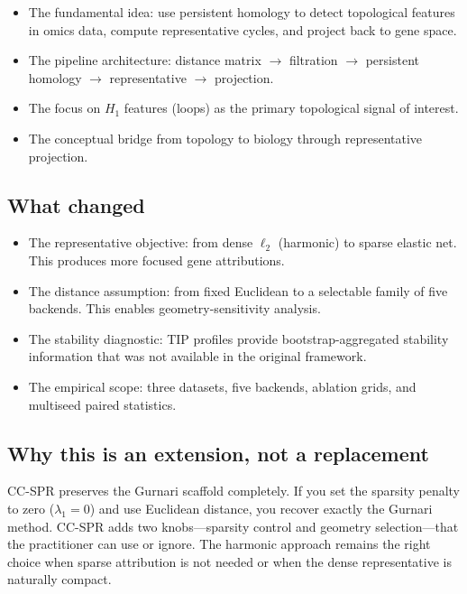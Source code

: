 \documentclass[11pt]{article}
\begin{document}
\begin{itemize}[leftmargin=1.5em]
\item The fundamental idea: use persistent homology to detect topological features in omics data, compute representative cycles, and project back to gene space.
\item The pipeline architecture: distance matrix $\to$ filtration $\to$ persistent homology $\to$ representative $\to$ projection.
\item The focus on $H_1$ features (loops) as the primary topological signal of interest.
\item The conceptual bridge from topology to biology through representative projection.
\end{itemize}

\subsection{What changed}

\begin{itemize}[leftmargin=1.5em]
\item The representative objective: from dense $\ell_2$ (harmonic) to sparse elastic net.
This produces more focused gene attributions.
\item The distance assumption: from fixed Euclidean to a selectable family of five backends.
This enables geometry-sensitivity analysis.
\item The stability diagnostic: TIP profiles provide bootstrap-aggregated stability information that was not available in the original framework.
\item The empirical scope: three datasets, five backends, ablation grids, and multiseed paired statistics.
\end{itemize}

\subsection{Why this is an extension, not a replacement}

CC-SPR preserves the Gurnari scaffold completely.
If you set the sparsity penalty to zero ($\lambda_1 = 0$) and use Euclidean distance, you recover exactly the Gurnari method.
CC-SPR adds two knobs---sparsity control and geometry selection---that the practitioner can use or ignore.
The harmonic approach remains the right choice when sparse attribution is not needed or when the dense representative is naturally compact.
\end{document}
